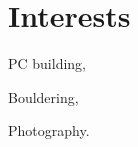     \section{Interests}

    \begin{twocolentry}{}
        \begin{highlights}
            \item PC building,
            \item Bouldering,
            \item Photography.
        \end{highlights}
    \end{twocolentry}
